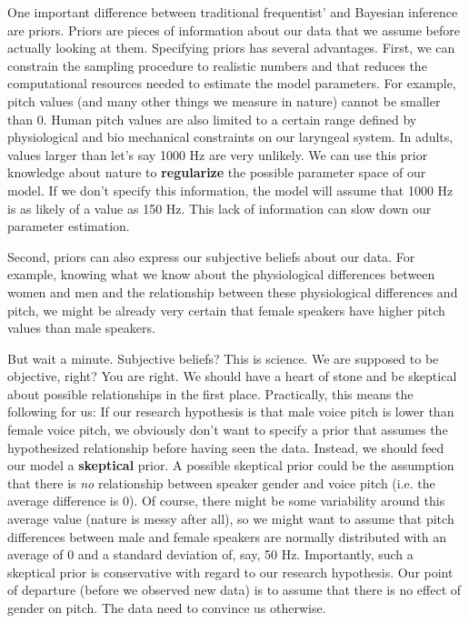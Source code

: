 \documentclass[nobib]{tufte-handout}
\begin{document}
One important difference between traditional frequentist' and Bayesian inference are priors. Priors are pieces of information about our data that we assume before actually looking at them. Specifying priors has several advantages. First, we can constrain the sampling procedure to realistic numbers and that reduces the computational resources needed to estimate the model parameters. For example, pitch values (and many other things we measure in nature) cannot be smaller than 0. Human pitch values are also limited to a certain range defined by physiological and bio mechanical constraints on our laryngeal system. In adults, values larger than let's say 1000 Hz are very unlikely. We can use this prior knowledge about nature to \textbf{regularize} the possible parameter space of our model. If we don't specify this information, the model will assume that 1000 Hz is as likely of a value as 150 Hz. This lack of information can slow down our parameter estimation. 
 
Second, priors can also express our subjective beliefs about our data. For example, knowing what we know about the physiological differences between women and men and the relationship between these physiological differences and pitch, we might be already very certain that female speakers have higher pitch values than male speakers.

But wait a minute. Subjective beliefs? This is science. We are supposed to be objective, right? You are right. We should have a heart of stone and be skeptical about possible relationships in the first place.
Practically, this means the following for us: If our research hypothesis is that male voice pitch is lower than female voice pitch, we obviously don't want to specify a prior that assumes the hypothesized relationship before having seen the data. Instead, we should feed our model a \textbf{skeptical} prior. A possible skeptical prior could be the assumption that there is \textit{no} relationship between speaker gender and voice pitch (i.e. the average difference is 0). Of course, there might be some variability around this average value (nature is messy after all), so we might want to assume that pitch differences between male and female speakers are normally distributed with an average of 0 and a standard deviation of, say, 50 Hz. Importantly, such a skeptical prior is conservative with regard to our research hypothesis. Our point of departure (before we observed new data) is to assume that there is no effect of gender on pitch. The data need to convince us otherwise.
\end{document}
